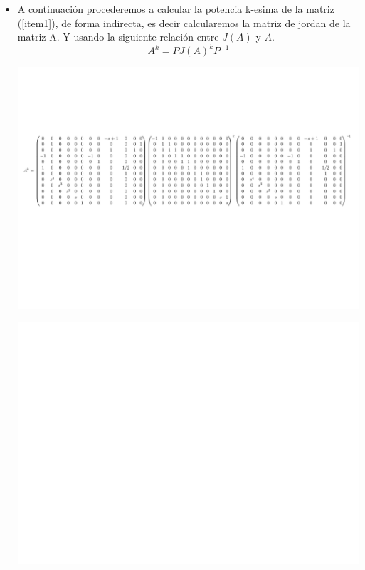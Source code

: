 \documentclass[12pt,a4paper]{article}
\begin{document}
\begin{itemize}
	\item A continuación procederemos a calcular la potencia k-esima de la matriz  (\ref{item1}), de forma indirecta, es decir calcularemos la matriz de jordan de la matriz A. Y usando la siguiente relación entre $J(A)$ y $A$.
	$$A^{k} = PJ(A)^{k}P^{-1}$$
	\begin{center}
		\includegraphics[page=1, trim= 0.5cm 8.7cm 0.5cm 5.5cm ,clip,scale=0.55]{MatrixJordan.pdf}
	\end{center}
	\begin{center}
		\includegraphics[page=2, trim= 4cm 2cm 0cm 4cm ,clip,scale=0.62]{MatrixSimb.pdf}
	\end{center}
	

\end{itemize}
\end{document}
